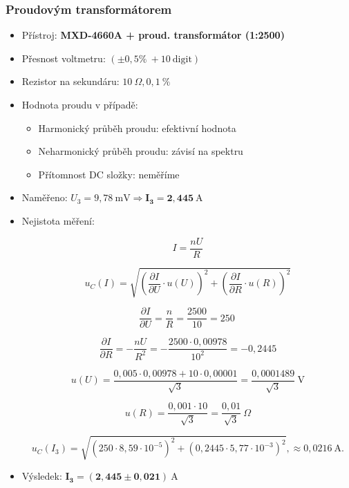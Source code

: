 \documentclass[a4paper,12pt]{article}
\begin{document}
\subsubsection{Proudovým transformátorem}
\begin{itemize}
  \item Přístroj: \textbf{MXD-4660A + proud. transformátor (1:2500)}
  \item Přesnost voltmetru: $(\pm 0,5 \%\ + 10\ \mathrm{digit})$
  \item Rezistor na sekundáru: $10\ \Omega, 0,1\ \%$
  \item Hodnota proudu v případě:
    \begin{itemize}
      \item Harmonický průběh proudu: efektivní hodnota
      \item Neharmonický průběh proudu: závisí na spektru
      \item Přítomnost DC složky: neměříme
    \end{itemize}
  \item Naměřeno: $U_3 = 9{,}78\ \mathrm{mV} \Rightarrow \mathbf{I_3 = 2{,}445\ \mathrm{A}}$
  \item Nejistota měření:

  $$
    I = \frac{nU}{R}
  $$

  $$
    u_C(I) = \sqrt{
      \left( \frac{\partial I}{\partial U} \cdot u(U) \right)^2 +
      \left( \frac{\partial I}{\partial R} \cdot u(R) \right)^2
    }
  $$

  $$
    \frac{\partial I}{\partial U} = \frac{n}{R} = \frac{2500}{10} = 250\
  $$

  $$
    \frac{\partial I}{\partial R} = -\frac{nU}{R^2}
    = -\frac{2500 \cdot 0{,}00978}{10^2}
    = -0{,}2445
  $$

  $$
    u(U) = \frac{0{,}005 \cdot 0{,}00978 + 10 \cdot 0{,}00001}{\sqrt{3}}
    = \frac{0{,}0001489}{\sqrt{3}}\ \mathrm{V}
  $$

  $$
    u(R) = \frac{0{,}001 \cdot 10}{\sqrt{3}} = \frac{0{,}01}{\sqrt{3}}\ \Omega
  $$

  $$
    u_C(I_3) = \sqrt{(250 \cdot 8{,}59 \cdot 10^{-5})^2 + (0{,}2445 \cdot 5{,}77 \cdot 10^{-3})^2},\approx 0{,}0216\ \mathrm{A}.
  $$

  \item Výsledek: $\mathbf{I_3 = (2{,}445 \pm 0{,}021)\ \mathrm{A}}$
\end{itemize}
\end{document}
